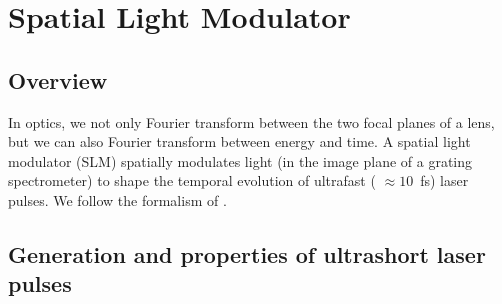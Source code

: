 \renewcommand{\lastmod}{September 18, 2023}
\renewcommand{\chapterauthors}{Markus Lippitz, Christoph Schnupfhagn}

\chapter{Spatial Light Modulator}

\section{Overview}

In optics, we not only Fourier transform between the two focal planes of a lens, but we can also Fourier transform between energy and time. A spatial light modulator (SLM) spatially modulates light (in the image plane of a grating spectrometer) to shape the temporal evolution of ultrafast ( $\approx 10$~fs) laser pulses. We follow the formalism of \cite{Traeger2012}.

\section{Generation and properties of ultrashort laser pulses}

